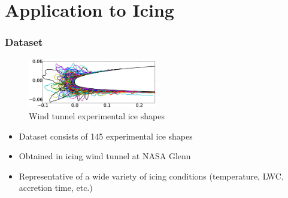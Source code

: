 \documentclass[9pt]{beamer}
\begin{document}
\section{Application to Icing}
\label{sec-3}
\begin{frame}
\frametitle{Dataset}
\label{sec-3-1}

\vspace*{-0.0cm}\begin{figure}
      \includegraphics[width=0.5\textwidth]{GlobalDataSet}
      \caption{Wind tunnel experimental ice shapes}
\end{figure}
\begin{itemize}
\item Dataset consists of 145 experimental ice shapes
\item Obtained in icing wind tunnel at NASA Glenn\footnotemark[1]
\item Representative of a wide variety of icing conditions (temperature,
  LWC, accretion time, etc.)
\end{itemize}
\end{frame}
\end{document}
